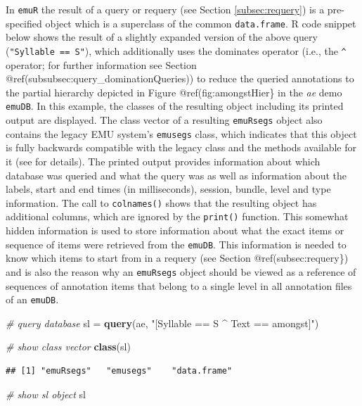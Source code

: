 \documentclass[]{book}
\newenvironment{Shaded}{\begin{snugshade}}{\end{snugshade}}
\newcommand{\CommentTok}[1]{\textcolor[rgb]{0.56,0.35,0.01}{\textit{#1}}}
\newcommand{\KeywordTok}[1]{\textcolor[rgb]{0.13,0.29,0.53}{\textbf{#1}}}
\newcommand{\NormalTok}[1]{#1}
\newcommand{\StringTok}[1]{\textcolor[rgb]{0.31,0.60,0.02}{#1}}
\theoremstyle{definition}
\theoremstyle{definition}
\theoremstyle{definition}
\theoremstyle{remark}
\begin{document}
In \texttt{emuR} the result of a query or requery (see Section
\ref{subsec:requery}) is a pre-specified object which is a superclass of
the common \texttt{data.frame}. R code snippet below shows the result of
a slightly expanded version of the above query
(\texttt{"Syllable\ ==\ S"}), which additionally uses the dominates
operator (i.e., the \texttt{\^{}} operator; for further information see
Section @ref(subsubsec:query\_dominationQueries)) to reduce the queried
annotations to the partial hierarchy depicted in Figure
@ref(fig:amongstHier\} in the \emph{ae} demo \texttt{emuDB}. In this
example, the classes of the resulting object including its printed
output are displayed. The class vector of a resulting \texttt{emuRsegs}
object also contains the legacy EMU system's \texttt{emusegs} class,
which indicates that this object is fully backwards compatible with the
legacy class and the methods available for it (see
\citet{harrington:2010a} for details). The printed output provides
information about which database was queried and what the query was as
well as information about the labels, start and end times (in
milliseconds), session, bundle, level and type information. The call to
\texttt{colnames()} shows that the resulting object has additional
columns, which are ignored by the \texttt{print()} function. This
somewhat hidden information is used to store information about what the
exact items or sequence of items were retrieved from the \texttt{emuDB}.
This information is needed to know which items to start from in a
requery (see Section @ref(subsec:requery\}) and is also the reason why
an \texttt{emuRsegs} object should be viewed as a reference of sequences
of annotation items that belong to a single level in all annotation
files of an \texttt{emuDB}.

\begin{Shaded}
\begin{Highlighting}[]
\CommentTok{# query database}
\NormalTok{sl =}\StringTok{ }\KeywordTok{query}\NormalTok{(ae, }\StringTok{"[Syllable == S ^ Text == amongst]"}\NormalTok{)}

\CommentTok{# show class vector}
\KeywordTok{class}\NormalTok{(sl)}
\end{Highlighting}
\end{Shaded}

\begin{verbatim}
## [1] "emuRsegs"   "emusegs"    "data.frame"
\end{verbatim}

\begin{Shaded}
\begin{Highlighting}[]
\CommentTok{# show sl object}
\NormalTok{sl}
\end{Highlighting}
\end{Shaded}
\end{document}
